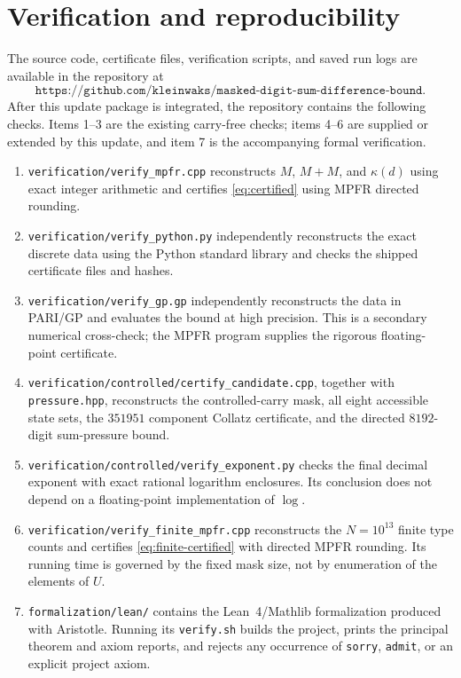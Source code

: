 \documentclass[11pt]{article}
\newcommand{\packageurl}{\texttt{https://github.com/kleinwaks/masked-digit-sum-difference-bound}}
\begin{document}
\section{Verification and reproducibility}
The source code, certificate files, verification scripts, and saved run
logs are available in the repository at
\[
 \packageurl.
\]
After this update package is integrated, the repository contains the
following checks.  Items 1--3 are the existing carry-free checks; items
4--6 are supplied or extended by this update, and item 7 is the accompanying
formal verification.
\begin{enumerate}
 \item \texttt{verification/verify\_mpfr.cpp} reconstructs $M$, $M+M$, and
 $\kappa(d)$ using exact integer arithmetic and certifies
 \eqref{eq:certified} using MPFR directed rounding.
 \item \texttt{verification/verify\_python.py} independently reconstructs
 the exact discrete data using the Python standard library and checks the
 shipped certificate files and hashes.
 \item \texttt{verification/verify\_gp.gp} independently reconstructs the
 data in PARI/GP and evaluates the bound at high precision. This is a
 secondary numerical cross-check; the MPFR program supplies the rigorous
 floating-point certificate.
 \item \texttt{verification/controlled/certify\_candidate.cpp}, together
 with \texttt{pressure.hpp}, reconstructs the controlled-carry mask, all
 eight accessible state sets, the $351951$ component Collatz certificate,
 and the directed $8192$-digit sum-pressure bound.
 \item \texttt{verification/controlled/verify\_exponent.py} checks the final
 decimal exponent with exact rational logarithm enclosures.  Its conclusion
 does not depend on a floating-point implementation of $\log$.
 \item \texttt{verification/verify\_finite\_mpfr.cpp} reconstructs the
 $N=10^{13}$ finite type counts and certifies
 \eqref{eq:finite-certified} with directed MPFR rounding.  Its running time
 is governed by the fixed mask size, not by enumeration of the elements of
 $U$.
 \item \texttt{formalization/lean/} contains the Lean~4/Mathlib
 formalization produced with Aristotle.  Running its \texttt{verify.sh}
 builds the project, prints the principal theorem and axiom reports, and
 rejects any occurrence of \texttt{sorry}, \texttt{admit}, or an explicit
 project axiom.
\end{enumerate}
\end{document}
